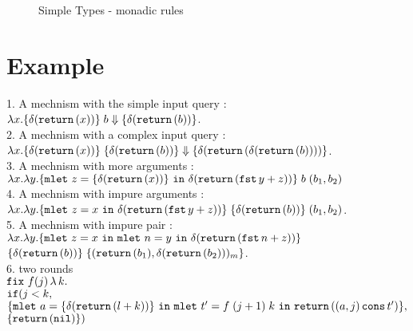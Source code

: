 \documentclass[a4paper,11pt]{article}
\theoremstyle{definition}
\begin{document}
 \begin{figure}[h]
  \caption{Simple Types - monadic rules}
  \label{fig:simple-types-monadic}
\end{figure}

\clearpage
\section{Example}
1. A mechnism with the simple input query : $\lambda x. \{
  \delta(\mathtt{return} \,(x)) \} \; b \mathrel{\Downarrow} \{\delta(\mathtt{return} \,(b))\} $.\\
2. A mechnism with a complex input query : $\lambda x. \{
  \delta(\mathtt{return} \,(x)) \} \; \{\delta(\mathtt{return} \,(b))\} \mathrel{\Downarrow}
\{\delta(\mathtt{return} \,( \delta(\mathtt{return} \,(b)) ))\} $.\\
3. A mechnism with more arguments : \\
 $ \lambda x. \lambda y. \{ \mathop{\mathtt{mlet}}\, z=
     \{\delta(\mathtt{return} \,(x))\}  \, \mathop{\mathtt{in}}\,    \delta( \mathtt{return} \,{ (\mathtt{fst}\,{y} +
       z) }  )   \}  \; b \; (b_1, b_2)$\\
 4.  A mechnism with impure arguments : \\
 $ \lambda x. \lambda y. \{ \mathop{\mathtt{mlet}}\, z=
     x \, \mathop{\mathtt{in}}\,    \delta( \mathtt{return} \,{ (\mathtt{fst}\,{y} + z) }  )   \} \;
 \{\delta(\mathtt{return} \,(b))\} \; ( b_1,b_2) $.\\
5.  A mechnism with impure pair : \\
 $ \lambda x. \lambda y. \{ \mathop{\mathtt{mlet}}\, z=
     x \, \mathop{\mathtt{in}}\, 
     \mathop{\mathtt{mlet}}\, n=y\, \mathop{\mathtt{in}}\, 
     \delta( \mathtt{return} \,{ (\mathtt{fst}\,{n} + z) }  )  
 \} \;$ \\
 $\{\delta(\mathtt{return} \,(b))\} \; \{(  \mathtt{return} \,( b_1), 
    \delta( \mathtt{return} \,( b_2) )  )_m \}$.\\
6. two rounds\\
$\mathop{\mathtt{fix}} \, f(j) \, \lambda \, k.  $\\
$ \mathtt{if} ( j < k , $\\
$\{ \mathop{\mathtt{mlet}}\, a= \{\delta (\mathtt{return} \,(l+k) ) \}
  \, \mathop{\mathtt{in}}\,  \mathop{\mathtt{mlet}}\, t'=f \; (j+1) \; k \, \mathop{\mathtt{in}}\,   \mathtt{return} \,( (a, j) \mathop{\mathtt{cons}} t' )  \} ,   $\\
$ \{ \mathtt{return} \, ( \mathtt{nil} )  \} ) $\\
\end{document}
